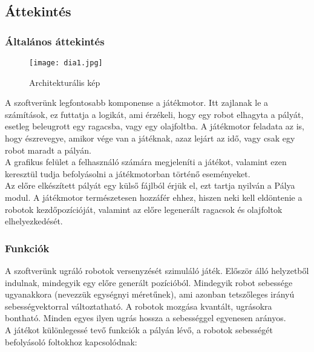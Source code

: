 \usepackage{graphicx}
\usepackage[export]{adjustbox}






\subsection{Áttekintés}

\subsubsection{Általános áttekintés}
\begin{figure}[ht!]
	\centering
	\texttt{[image: dia1.jpg]}
	\caption{Architekturális kép \label{overflow}}
\end{figure}

A szoftverünk legfontosabb komponense a játékmotor. Itt zajlanak le a számítások, ez futtatja a logikát, ami érzékeli, hogy egy robot elhagyta a pályát, esetleg beleugrott egy ragacsba, vagy egy olajfoltba. A játékmotor feladata az is, hogy észrevegye, amikor vége van a játéknak, azaz lejárt az idő, vagy csak egy robot maradt a pályán. \\

A grafikus felület a felhasználó számára megjeleníti a játékot, valamint ezen keresztül tudja befolyásolni a játékmotorban történő eseményeket. \\

Az előre elkészített pályát egy külső fájlból érjük el, ezt tartja nyilván a Pálya modul. A játékmotor természetesen hozzáfér ehhez, hiszen neki kell eldöntenie a robotok kezdőpozícióját, valamint az előre legenerált ragacsok és olajfoltok elhelyezkedését. \\

\subsubsection{Funkciók}

A szoftverünk ugráló robotok versenyzését szimuláló játék. Először álló helyzetből indulnak, mindegyik egy előre generált pozícióból. Mindegyik robot sebessége ugyanakkora (nevezzük egységnyi méretűnek), ami azonban tetszőleges irányú sebességvektorral változtatható. A robotok mozgása kvantált, ugrásokra bontható. Minden egyes ilyen ugrás hossza a sebességgel egyenesen arányos. \\

A játékot különlegessé tevő funkciók a pályán lévő, a robotok sebességét befolyásoló foltokhoz kapcsolódnak:

